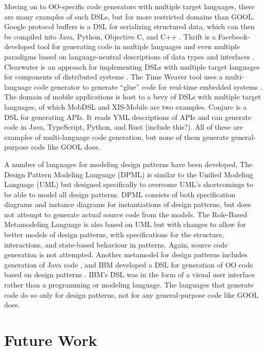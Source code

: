 \documentclass[sigplan,review,anonymous]{acmart}
\begin{document}
Moving on to OO-specific code generators with multiple target languages, there 
are many examples of such DSLs, but for more restricted domains than GOOL. 
Google protocol buffers is a DSL for serializing structured data, which can 
then be compiled into Java, Python, Objective C, and C++ \cite{Protobuf}. 
Thrift is a Facebook-developed tool for generating code in multiple languages 
and even multiple paradigms based on language-neutral descriptions of data 
types and interfaces \cite{slee2007thrift}. Clearwater is an approach for 
implementing DSLs with multiple target languages for components of distributed 
systems \cite{swint2005clearwater}. The Time Weaver tool uses a multi-language 
code generator to generate ``glue'' code for real-time embedded systems 
\cite{de2004glue}. The domain of mobile applications is host to a bevy of DSLs 
with multiple target languages, of which MobDSL \cite{kramer2010mobdsl} and 
XIS-Mobile \cite{ribeiro2014xis} are two examples. Conjure is a DSL for 
generating APIs. It reads YML descriptions of APIs and can generate code in 
Java, TypeScript, Python, and Rust \cite{Conjure} (include this?). All of these 
are examples of multi-language code generation, but none of them generate 
general-purpose code like GOOL does.

A number of languages for modeling design patterns have been developed. The 
Design Pattern Modeling Language (DPML) \cite{mapelsden2002design} is similar 
to the Unified Modeling Language (UML) but designed specifically to overcome 
UML's shortcomings to be able to model all design patterns. DPML consists of 
both specification diagrams and instance diagrams for instantiations of design 
patterns, but does not attempt to generate actual source code from the models. 
The Role-Based Metamodeling Language \cite{kim2003uml} is also based on UML but 
with changes to allow for better models of design patterns, with specifications 
for the structure, interactions, and state-based behaviour in patterns. Again, 
source code generation is not attempted. Another metamodel for design patterns 
includes generation of Java code \cite{albin2001meta}, and IBM developed a DSL 
for generation of OO code based on design patterns 
\cite{budinsky1996automatic}. IBM's DSL was in the form of a visual user 
interface rather than a programming or modeling language. The languages that 
generate code do so only for design patterns, not for any general-purpose code 
like GOOL does.

\section{Future Work} \label{future}
\end{document}
